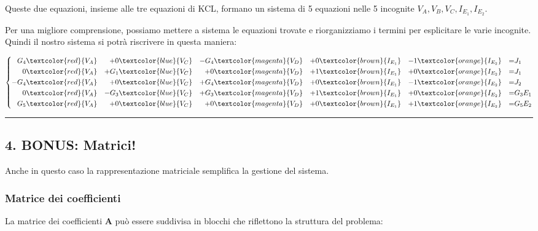 Queste due equazioni, insieme alle tre equazioni di KCL, formano un sistema di 5 equazioni nelle 5 incognite \(V_A, V_B, V_C, I_{E_1}, I_{E_2}\).


Per una migliore comprensione, possiamo mettere a sistema le equazioni trovate e riorganizziamo i termini per esplicitare le varie incognite.
Quindi il nostro sistema si potrà riscrivere in questa maniera:

\begin{equation}
    \left\{
\begin{aligned}
G_4&\textcolor{red}{V_A} & +0&\textcolor{blue}{V_C} & - G_4&\textcolor{magenta}{V_D} & +0 &\textcolor{brown}{I_{E_1}} & - 1&\textcolor{orange}{I_{E_2}} & = & J_1 \\
0&\textcolor{red}{V_A} & + G_1&\textcolor{blue}{V_C} & +0 &\textcolor{magenta}{V_D} & + 1 &\textcolor{brown}{I_{E_1}} & +0&\textcolor{orange}{I_{E_2}} & = & J_1 \\
-G_4&\textcolor{red}{V_A} & +0&\textcolor{blue}{V_C} & + G_4&\textcolor{magenta}{V_D} & +0& \textcolor{brown}{I_{E_1}} & - 1&\textcolor{orange}{I_{E_2}} & = & J_2 \\
0&\textcolor{red}{V_A} & - G_3&\textcolor{blue}{V_C} & + G_3&\textcolor{magenta}{V_D} & + 1 &\textcolor{brown}{I_{E_1}} & +0&\textcolor{orange}{I_{E_2}} & = & G_3E_1 \\
G_5&\textcolor{red}{V_A} & +0&\textcolor{blue}{V_C} & +0 &\textcolor{magenta}{V_D} & +0 &\textcolor{brown}{I_{E_1}} & + 1&\textcolor{orange}{I_{E_2}} & = & G_5E_2
\end{aligned}
\right.
\end{equation}



\hrule
\subsection*{4. BONUS: Matrici!}

Anche in questo caso la rappresentazione matriciale semplifica la gestione del sistema.

\subsubsection*{Matrice dei coefficienti}

La matrice dei coefficienti \(\mathbf{A}\) può essere suddivisa in blocchi che riflettono la struttura del problema:

